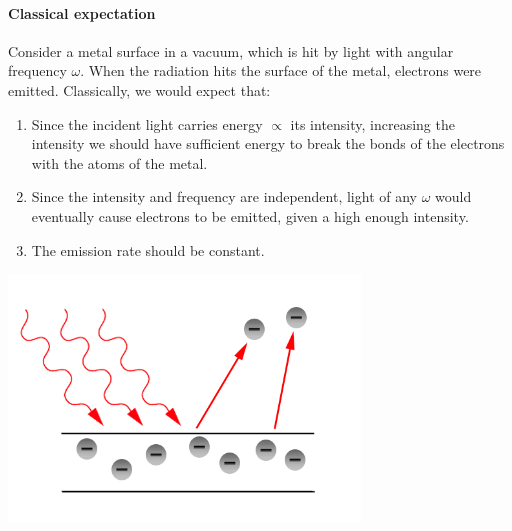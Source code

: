 \documentclass[a4paper]{article}
\begin{document}
\paragraph{Classical expectation}
Consider a metal surface in a vacuum, which is hit by light with angular frequency \( \omega \).
When the radiation hits the surface of the metal, electrons were emitted.
Classically, we would expect that:
\begin{enumerate}
	\item Since the incident light carries energy $ \propto $ its intensity, increasing the intensity we should have sufficient energy to break the bonds of the electrons with the atoms of the metal.
	\item Since the intensity and frequency are independent, light of any \( \omega \) would eventually cause electrons to be emitted, given a high enough intensity.
	\item The emission rate should be constant.
\end{enumerate}
\begin{center}
    \includegraphics[width=0.7\textwidth]{qm2.png}
\end{center}
\end{document}
